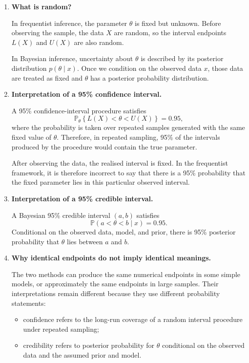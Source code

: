 \documentclass[11pt,a4paper]{article}
\newcommand{\given}{\mathrel{|}}
\begin{document}
\begin{enumerate}[label=\textbf{\arabic*.},leftmargin=*]
  \item \textbf{What is random?}

        In frequentist inference, the parameter $\theta$ is fixed but
        unknown. Before observing the sample, the data $X$ are random, so the
        interval endpoints $L(X)$ and $U(X)$ are also random.

        In Bayesian inference, uncertainty about $\theta$ is described by its
        posterior distribution $p(\theta\given x)$. Once we condition on the
        observed data $x$, those data are treated as fixed and $\theta$ has a
        posterior probability distribution.

  \item \textbf{Interpretation of a 95\% confidence interval.}

        A 95\% confidence-interval procedure satisfies
        \[
          \mathbb{P}_{\theta}\!\left\{L(X)<\theta<U(X)\right\}=0.95,
        \]
        where the probability is taken over repeated samples generated with
        the same fixed value of $\theta$. Therefore, in repeated sampling,
        95\% of the intervals produced by the procedure would contain the
        true parameter.

        After observing the data, the realised interval is fixed. In the
        frequentist framework, it is therefore incorrect to say that there is
        a 95\% probability that the fixed parameter lies in this particular
        observed interval.

  \item \textbf{Interpretation of a 95\% credible interval.}

        A Bayesian 95\% credible interval $(a,b)$ satisfies
        \[
          \mathbb{P}(a<\theta<b\given x)=0.95.
        \]
        Conditional on the observed data, model, and prior, there is 95\%
        posterior probability that $\theta$ lies between $a$ and $b$.

  \item \textbf{Why identical endpoints do not imply identical meanings.}

        The two methods can produce the same numerical endpoints in some
        simple models, or approximately the same endpoints in large samples.
        Their interpretations remain different because they use different
        probability statements:
        \begin{itemize}[leftmargin=*]
          \item confidence refers to the long-run coverage of a random
                interval procedure under repeated sampling;
          \item credibility refers to posterior probability for $\theta$
                conditional on the observed data and the assumed prior and
                model.
        \end{itemize}
\end{enumerate}
\end{document}
